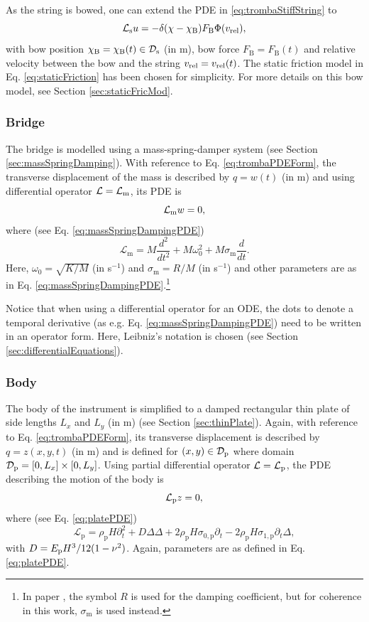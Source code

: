 As the string is bowed, one can extend the PDE in \eqref{eq:trombaStiffString} to 
\begin{equation}
    \mathcal{L}_{\text{s}} u =  - \delta(\chi-\chi_\text{B})F_\text{B}\Phi(v_\text{rel}),
\end{equation}
with bow position $\chi_\text{B} = \chi_\text{B}(t) \in \mathcal{D}_{\text{s}}$ (in m), bow force $F_\text{B} = F_\text{B}(t)$ and relative velocity between the bow and the string $v_\text{rel}=v_\text{rel}(t)$. The static friction model in Eq. \eqref{eq:staticFriction} has been chosen for simplicity. For more details on this bow model, see Section \ref{sec:staticFricMod}.

\subsubsection{Bridge}
The bridge is modelled using a mass-spring-damper system (see Section \ref{sec:massSpringDamping}). With reference to Eq. \eqref{eq:trombaPDEForm}, the transverse displacement of the mass is described by $q = w(t)$ (in m) and using differential operator $\mathcal{L} = \mathcal{L}_\text{m}$, its PDE is 
\begin{equation}
    \mathcal{L}_\text{m} w = 0,
\end{equation}
where (see Eq. \eqref{eq:massSpringDampingPDE})
\begin{equation*}
    \mathcal{L}_\text{m}=M\frac{d^2}{dt^2}+M\omega_0^2+M\sigma_\text{m}\frac{d}{dt}.
\end{equation*}
Here, $\omega_0 = \sqrt{K/M}$ (in s$^{-1}$) and $\sigma_\text{m} = R/M$ (in s$^{-1}$) and other parameters are as in Eq. \eqref{eq:massSpringDampingPDE}.\footnote{In paper \citeP[D], the symbol $R$ is used for the damping coefficient, but for coherence in this work, $\sigma_\text{m}$ is used instead.} 

Notice that when using a differential operator for an ODE, the dots to denote a temporal derivative (as e.g. Eq. \eqref{eq:massSpringDampingPDE}) need to be written in an operator form. Here, Leibniz's notation is chosen (see Section \ref{sec:differentialEquations}). 


\subsubsection{Body}
The body of the instrument is simplified to a damped rectangular thin plate of side lengths $L_x$ and $L_y$ (in m) (see Section \ref{sec:thinPlate}). Again, with reference to Eq. \eqref{eq:trombaPDEForm}, its transverse displacement is described by $q = z(x, y, t)$ (in m) and is defined for $(x, y) \in \mathcal{D}_{\text{p}}$ where domain $\mathcal{D}_{\text{p}} = [0, L_x] \times [0, L_y]$. Using partial differential operator $\mathcal{L} = \mathcal{L}_{\text{p}}$, the PDE describing the motion of the body is 
\begin{equation}
    \mathcal{L}_{\text{p}} z = 0,
\end{equation}
where (see Eq. \eqref{eq:platePDE})
\begin{equation*}
    \mathcal{L}_\text{p} = \rho_\text{p}H\partial_t^2 + D\Delta\Delta +2\rho_\text{p}H\sigma_{0,\text{p}}\partial_t-2\rho_\text{p}H\sigma_{1,\text{p}}\partial_t\Delta,
\end{equation*}
with $D = E_{\text{p}} H^3/12(1-\nu^2)$. Again, parameters are as defined in Eq. \eqref{eq:platePDE}.

